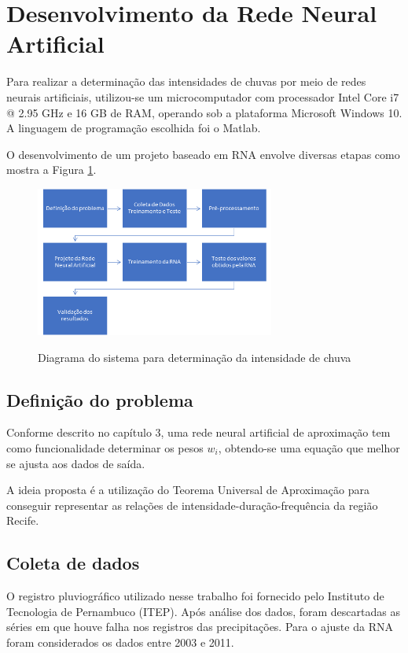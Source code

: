 \section{Desenvolvimento da Rede Neural Artificial}

Para realizar a determinação das intensidades de chuvas por meio de redes neurais artificiais, utilizou-se um microcomputador com processador Intel Core i7 @ 2.95 GHz e 16 GB de RAM, operando sob a plataforma Microsoft Windows 10. A linguagem de programação escolhida foi o Matlab.

O desenvolvimento de um projeto baseado em RNA envolve diversas etapas como mostra a Figura \ref{fig:fluxograma}. 

\begin{figure}[h]
    \caption{Diagrama do sistema para determinação da intensidade de chuva}
    \centering
    \includegraphics[width=0.70\textwidth]{Textuais/Figuras/fluxograma.png}
    \label{fig:fluxograma}
\end{figure}

\subsection{Definição do problema}

Conforme descrito no capítulo 3, uma rede neural artificial de aproximação tem como funcionalidade determinar os pesos $w_i$, obtendo-se uma equação que melhor se ajusta aos dados de saída.

A ideia proposta é a utilização do Teorema Universal de Aproximação para conseguir representar as relações de intensidade-duração-frequência da região Recife.

\subsection{Coleta de dados}

O registro pluviográfico utilizado nesse trabalho foi fornecido pelo Instituto de Tecnologia de Pernambuco (ITEP). Após análise dos dados, foram descartadas as séries em que houve falha nos registros das precipitações. Para o ajuste da RNA foram considerados os dados entre 2003 e 2011.

